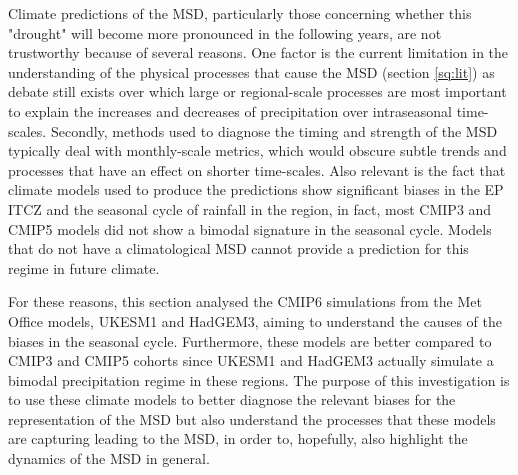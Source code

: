 Climate predictions of the MSD, particularly those concerning whether this "drought" will become more pronounced in the following years, are not trustworthy because of several reasons. 
One factor is the current limitation in the understanding of the physical processes that cause the MSD (section \ref{sq:lit}) as debate still exists over which large or regional-scale processes are most important to explain the increases and decreases of precipitation over intraseasonal time-scales.
Secondly, methods used to diagnose the timing and strength of the MSD typically deal with monthly-scale metrics, which would obscure subtle trends and processes that have an effect on shorter time-scales. 
Also relevant is the fact that climate models used to produce the predictions show significant biases in the EP ITCZ and the seasonal cycle of rainfall in the region, in fact, most CMIP3 and CMIP5 models did not show a bimodal signature in the seasonal cycle. Models that do not have a climatological MSD cannot provide a prediction for this regime in future climate. 

For these reasons, this section analysed the CMIP6 simulations from the Met Office models, UKESM1 and HadGEM3, aiming to understand the causes of the biases in the seasonal cycle. Furthermore, these models are better compared to CMIP3 and CMIP5 cohorts since UKESM1 and HadGEM3 actually simulate a bimodal precipitation regime in these regions. 
The purpose of this investigation is to use these climate models to better diagnose the relevant biases for the representation of the MSD but also understand the processes that these models are capturing leading to the MSD, in order to, hopefully, also highlight the dynamics of the MSD in general. 







